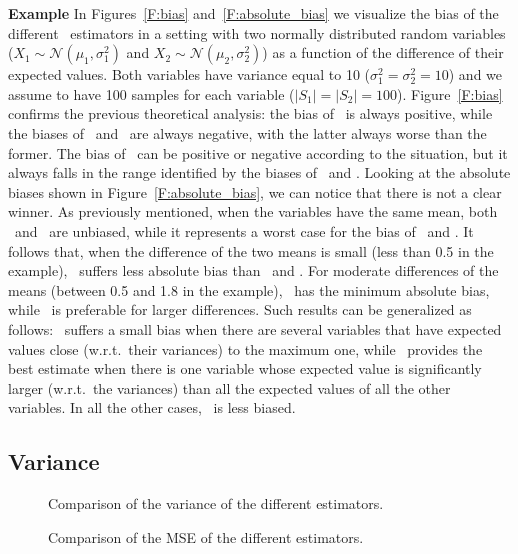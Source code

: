 \textbf{Example} In Figures~\ref{F:bias} and~\ref{F:absolute_bias} we visualize the bias of the different \MEV~estimators in a setting with two normally distributed random variables ($X_1\sim\mathcal{N}(\mu_1,\sigma_1^2)$ and $X_2\sim\mathcal{N}(\mu_2,\sigma_2^2)$) as a function of the difference of their expected values. Both variables have variance equal to 10 ($\sigma_1^2=\sigma_2^2=10$) and we assume to have 100 samples for each variable ($|S_1|=|S_2|=100$).
Figure~\ref{F:bias} confirms the previous theoretical analysis: the bias of \ME~is always positive, while the biases of \OWE~and \CV~are always negative, with the latter always worse than the former.
The bias of \WE~can be positive or negative according to the situation, but it always falls in the range identified by the biases of \ME~and \CV. 
Looking at the absolute biases shown in Figure~\ref{F:absolute_bias}, we can notice that there is not a clear winner.
As previously mentioned, when the variables have the same mean, both \CV~and \OWE~are unbiased, while it represents a worst case for the bias of \ME~and \WE. It follows that, when the difference of the two means is small (less than 0.5 in the example), \CV~suffers less absolute bias than \ME~and \WE. For moderate differences of the means (between 0.5 and 1.8 in the example), \WE~has the minimum absolute bias, while \ME~is preferable for larger differences.
Such results can be generalized as follows: \CV~suffers a small bias when there are several variables that have expected values close (w.r.t.~their variances) to the maximum one, while \ME~provides the best estimate when there is one variable whose expected value is significantly larger (w.r.t.~the variances) than all the expected values of all the other variables. In all the other cases, \WE~is less biased.

\subsection{Variance}


\begin{figure*}
    \begin{minipage}{0.5\textwidth}
    \centering 
    \setlength\figureheight{4cm}
    \setlength\figurewidth{6cm}
     
    \caption{Comparison of the variance of the different estimators.}\label{F:variance}
    \end{minipage}
    \hfill
    \begin{minipage}{0.45\textwidth}
     \centering 
    \setlength\figureheight{4cm}
    \setlength\figurewidth{6cm}
     
    \caption{Comparison of the MSE of the different estimators.}\label{F:mse}
    \end{minipage}
\end{figure*}

